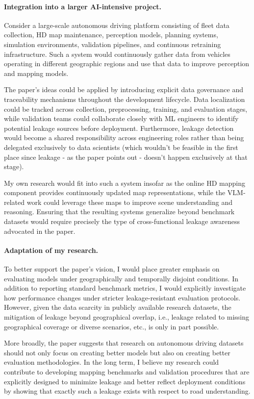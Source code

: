 \documentclass[11pt]{article}
\begin{document}
\paragraph{Integration into a larger AI-intensive project.} Consider a large-scale autonomous driving platform consisting of fleet data collection, HD map maintenance, perception models, planning systems, simulation environments, validation pipelines, and continuous retraining infrastructure. Such a system would continuously gather data from vehicles operating in different geographic regions and use that data to improve perception and mapping models.

The paper's ideas could be applied by introducing explicit data governance and traceability mechanisms throughout the development lifecycle. Data localization could be tracked across collection, preprocessing, training, and evaluation stages, while validation teams could collaborate closely with ML engineers to identify potential leakage sources before deployment. Furthermore, leakage detection would become a shared responsibility across engineering roles rather than being delegated exclusively to data scientists (which wouldn't be feasible in the first place since leakage - as the paper points out - doesn't happen exclusively at that stage).

My own research would fit into such a system insofar as the online HD mapping component provides continuously updated map representations, while the VLM-related work could leverage these maps to improve scene understanding and reasoning. Ensuring that the resulting systems generalize beyond benchmark datasets would require precisely the type of cross-functional leakage awareness advocated in the paper.

\paragraph{Adaptation of my research.}
To better support the paper's vision, I would place greater emphasis on evaluating models under geographically and temporally disjoint conditions. In addition to reporting standard benchmark metrics, I would explicitly investigate how performance changes under stricter leakage-resistant evaluation protocols. However, given the data scarcity in publicly available research datasets, the mitigation of leakage beyond geographical overlap, i.e., leakage related to missing geographical coverage or diverse scenarios, etc., is only in part possible.

More broadly, the paper suggests that research on autonomous driving datasets should not only focus on creating better models but also on creating better evaluation methodologies. In the long term, I believe my research could contribute to developing mapping benchmarks and validation procedures that are explicitly designed to minimize leakage and better reflect deployment conditions by showing that exactly such a leakage exists with respect to road understanding.
\end{document}
